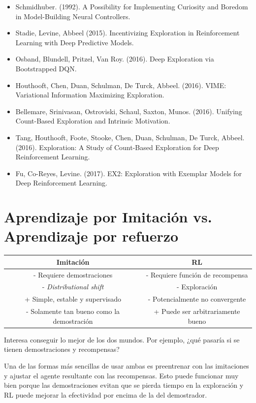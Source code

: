 \begin{itemize}
    \item Schmidhuber. (1992). A Possibility for Implementing Curiosity and Boredom in Model-Building Neural Controllers.
    \item Stadie, Levine, Abbeel (2015). Incentivizing Exploration in Reinforcement Learning with Deep Predictive Models.
    \item Osband, Blundell, Pritzel, Van Roy. (2016). Deep Exploration via Bootstrapped DQN.
    \item Houthooft, Chen, Duan, Schulman, De Turck, Abbeel. (2016). VIME: Variational Information Maximizing Exploration.
    \item Bellemare, Srinivasan, Ostroviski, Schaul, Saxton, Munos. (2016). Unifying Count-Based Exploration and Intrinsic Motivation.
    \item Tang, Houthooft, Foote, Stooke, Chen, Duan, Schulman, De Turck, Abbeel. (2016). Exploration: A Study of Count-Based Exploration for Deep Reinforcement Learning.
    \item Fu, Co-Reyes, Levine. (2017). EX2: Exploration with Exemplar Models for Deep Reinforcement Learning.
\end{itemize}

\section{Aprendizaje por Imitación vs. Aprendizaje por refuerzo}%
\label{sec:aprendizaje_por_imitación_vs_aprendizaje_por_refuerzo}

\begin{center}
    \begin{tabular}{c | c}
    Imitación & RL\\
    \hline
    - Requiere demostraciones & - Requiere función de recompensa\\
    - \textit{Distributional shift} & - Exploración\\
    + Simple, estable y supervisado & - Potencialmente no convergente\\
    - Solamente tan bueno como la demostración & + Puede ser arbitrariamente bueno
    \end{tabular}
\end{center}

Interesa conseguir lo mejor de los dos mundos. Por ejemplo, ¿qué pasaría si se tienen
demostraciones y recompensas?

Una de las formas más sencillas de usar ambas es preentrenar con las imitaciones y ajustar el
agente resultante con las recompensas. Esto puede funcionar muy bien porque las
demostraciones evitan que se pierda tiempo en la exploración y RL puede mejorar la efectividad
por encima de la del demostrador.

